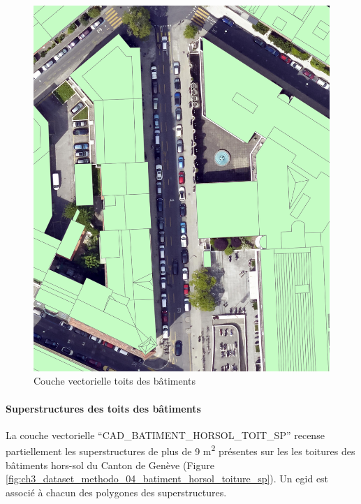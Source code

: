 \begin{figure}[H]
    \centering
    \includegraphics[width=1\linewidth]{02-main//figures/ch3_dataset_methodo_03_batiment_horsol_toiture.png}
    \caption{Couche vectorielle toits des bâtiments}
    \label{fig:ch3_dataset_methodo_03_batiment_horsol_toiture}
\end{figure}

\newpage
\paragraph{Superstructures des toits des bâtiments}
La couche vectorielle ``CAD\_BATIMENT\_HORSOL\_TOIT\_SP'' \cite{sitg_toits_nodate} recense partiellement les superstructures de plus de 9 \si{\unit{\square\meter}} présentes sur les les toitures des bâtiments hors-sol du Canton de Genève (Figure \ref{fig:ch3_dataset_methodo_04_batiment_horsol_toiture_sp}). Un \gls{egid} est associé à chacun des polygones des superstructures.

